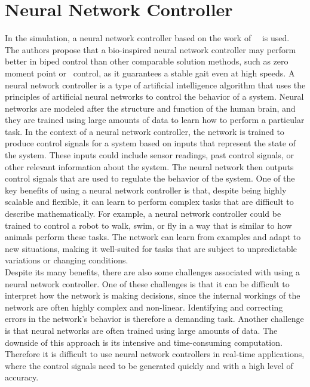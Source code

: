 \section{Neural Network Controller}
\label{sec:neural-controller}

    In the simulation, a neural network controller based on the work of~\citeauthor{Geng2006}~\cite{Geng2006} is used. The authors propose that a bio-inspired neural network controller may perform better in biped control than other comparable solution methods, such as zero moment point or~ control, as it guarantees a stable gait even at high speeds. A neural network controller is a type of artificial intelligence algorithm that uses the principles of artificial neural networks to control the behavior of a system. Neural networks are modeled after the structure and function of the human brain, and they are trained using large amounts of data to learn how to perform a particular task. In the context of a neural network controller, the network is trained to produce control signals for a system based on inputs that represent the state of the system. These inputs could include sensor readings, past control signals, or other relevant information about the system. The neural network then outputs control signals that are used to regulate the behavior of the system. One of the key benefits of using a neural network controller is that, despite being highly scalable and flexible, it can learn to perform complex tasks that are difficult to describe mathematically. For example, a neural network controller could be trained to control a robot to walk, swim, or fly in a way that is similar to how animals perform these tasks. The network can learn from examples and adapt to new situations, making it well-suited for tasks that are subject to unpredictable variations or changing conditions.~\cite{Geng2006}\\

    Despite its many benefits, there are also some challenges associated with using a neural network controller. One of these challenges is that it can be difficult to interpret how the network is making decisions, since the internal workings of the network are often highly complex and non-linear. Identifying and correcting errors in the network's behavior is therefore a demanding task. Another challenge is that neural networks are often trained using large amounts of data. The downside of this approach is its intensive and time-consuming computation. Therefore it is difficult to use neural network controllers in real-time applications, where the control signals need to be generated quickly and with a high level of accuracy.~\cite{Geng2006}\\
    
